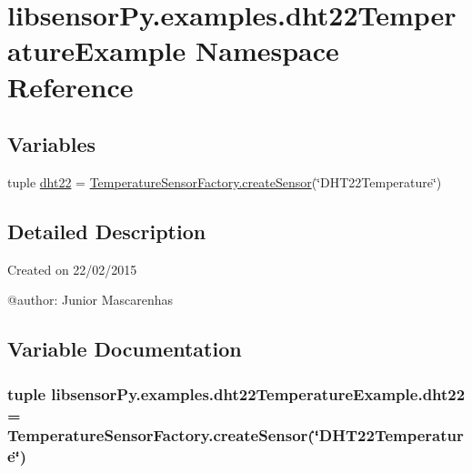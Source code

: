 \hypertarget{namespacelibsensorPy_1_1examples_1_1dht22TemperatureExample}{}\section{libsensor\+Py.\+examples.\+dht22\+Temperature\+Example Namespace Reference}
\label{namespacelibsensorPy_1_1examples_1_1dht22TemperatureExample}
\subsection*{Variables}
\begin{DoxyCompactItemize}
\item 
tuple \hyperlink{namespacelibsensorPy_1_1examples_1_1dht22TemperatureExample_a1cce00ec79ffb1f725ad255d575efa89}{dht22} = \hyperlink{classconcretefactory_1_1temperatureSensorFactory_1_1TemperatureSensorFactory_a10da40452b9fced7f217c6716e8d5ecc}{Temperature\+Sensor\+Factory.\+create\+Sensor}(\char`\"{}D\+H\+T22\+Temperature\char`\"{})
\end{DoxyCompactItemize}


\subsection{Detailed Description}
\begin{DoxyVerb}Created on 22/02/2015

@author: Junior Mascarenhas
\end{DoxyVerb}
 

\subsection{Variable Documentation}
\hypertarget{namespacelibsensorPy_1_1examples_1_1dht22TemperatureExample_a1cce00ec79ffb1f725ad255d575efa89}{}
\subsubsection[{dht22}]{\setlength{\rightskip}{0pt plus 5cm}tuple libsensor\+Py.\+examples.\+dht22\+Temperature\+Example.\+dht22 = {\bf Temperature\+Sensor\+Factory.\+create\+Sensor}(\char`\"{}D\+H\+T22\+Temperature\char`\"{})}\label{namespacelibsensorPy_1_1examples_1_1dht22TemperatureExample_a1cce00ec79ffb1f725ad255d575efa89}

